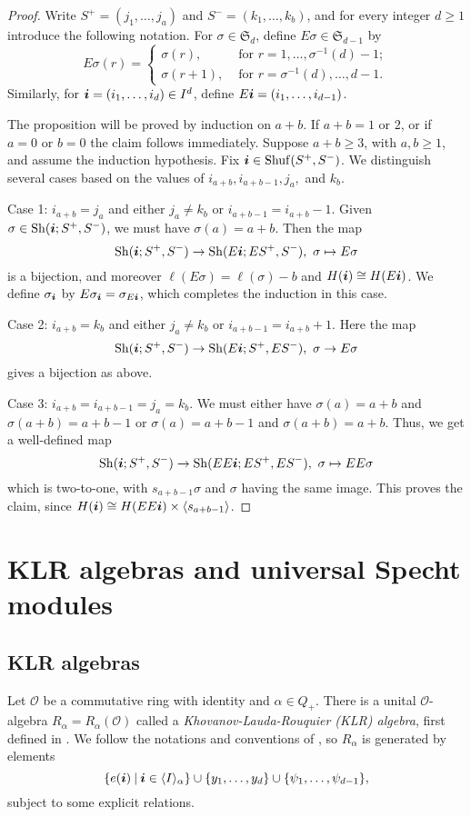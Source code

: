 \documentclass[twoside,11pt,reqno,letter]{amsart}
\numberwithin{equation}{section}
\theoremstyle{definition}  %
\let\<\langle
\let\>\rangle
\def\bi{\text{\boldmath$i$}}
\newcommand{\words}{\langle I \rangle}
\newcommand{\Shuf}{\operatorname{Shuf}}
\newcommand{\Sh}{\operatorname{Sh}}
\newcommand{\0}{{\bar 0}}
\newcommand{\1}{{\bar 1}}
\newcommand{\al}{\alpha}
\def\Si{\mathfrak{S}}
\newcommand{\si}{\sigma}
\renewcommand\O{\mathcal O}
\begin{document}
\begin{proof}
Write $S^+ = (j_1, \dots, j_a)$ and $S^- = (k_1, \dots, k_b)$, and for every integer $d \geq 1$ introduce the following notation. For $\si \in \Si_d$, define $E\si \in \Si_{d-1}$ by
$$E\si(r) = \begin{cases} \si(r),& \text{ for } r=1,\dots,\si^{-1}(d)-1;\\
  \si(r+1),& \text{ for } r=\si^{-1}(d),\dots,d-1. \end{cases}$$
 Similarly, for $\bi = (i_1, \dots, i_d) \in I^d$, define $E\bi = (i_1, \dots, i_{d-1})$.

The proposition will be proved by induction on $a+b$. If $a+b = 1$ or $2$, or if $a = 0$ or $b = 0$ the claim follows immediately.
Suppose $a+b \geq 3$, with $a, b \geq 1$, and assume the induction hypothesis.
Fix $\bi \in \Shuf(S^+, S^-)$.
We distinguish several cases based on the values of $i_{a+b}, i_{a+b-1}, j_a,$ and $k_b.$

Case 1: $i_{a+b} = j_a$ and either $j_a \neq k_b$ or $i_{a+b-1}=i_{a+b}-1$. Given $\si \in \Sh(\bi; S^+, S^-)$, we must have $\si(a) = a+b$. Then the map 
$$\Sh(\bi; S^+, S^-) \to \Sh(E\bi; ES^+,S^-),\ \si \mapsto E\si$$
is a bijection, and moreover $\ell(E\si) = \ell(\si) - b$ and $H(\bi) \cong H(E\bi)$. We define $\si_\bi$ by $E\si_\bi = \si_{E\bi}$, which completes the induction in this case.

Case 2: $i_{a+b} = k_b$ and either $j_a \neq k_b$ or $i_{a+b-1}=i_{a+b}+1$. Here the map
$$\Sh(\bi; S^+, S^-) \to \Sh(E\bi; S^+, ES^-),\ \si \to E\si$$
gives a bijection as above.

Case 3: $i_{a+b} = i_{a+b-1} = j_a = k_b$. We must either have $\si(a) = a+b$ and $\si(a+b) = a+b-1$ or $\si(a)=a+b-1$ and $\si(a+b) = a+b$. Thus, we get a well-defined map
$$\Sh(\bi; S^+, S^-) \to \Sh(EE\bi; ES^+, ES^-),\ \si \mapsto EE\si$$
which is two-to-one, with $s_{a+b-1} \si$ and $\si$ having the same image. This proves the claim, since $H(\bi) \cong H(EE\bi) \times \<s_{a+b-1}\>$.
\end{proof}







\section{KLR algebras and universal Specht modules}

\subsection{KLR algebras}
Let $\O$ be a commutative ring with identity and $\al\in Q_+$.  There is a unital $\O$-algebra $R_\al=R_\al(\O)$ called a {\em Khovanov-Lauda-Rouquier (KLR) algebra}, first defined in \cite{KL1,KL2,R}. We follow the notations and conventions of \cite{KMR}, so $R_\al$ is generated by elements
\begin{equation}\label{EKLGens}
\{e(\bi)\:|\: \bi\in \words_\al\}\cup\{y_1,\dots,y_{d}\}\cup\{\psi_1, \dots,\psi_{d-1}\},
\end{equation}
subject to some explicit relations.
\end{document}
